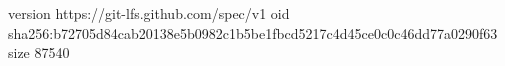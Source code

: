 version https://git-lfs.github.com/spec/v1
oid sha256:b72705d84cab20138e5b0982c1b5be1fbcd5217c4d45ce0c0c46dd77a0290f63
size 87540
